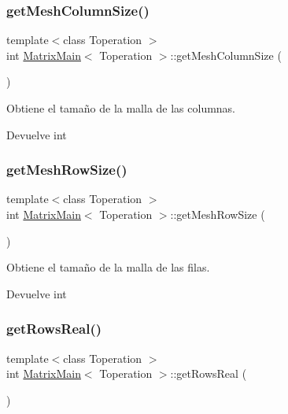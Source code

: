 \subsubsection{\texorpdfstring{get\+Mesh\+Column\+Size()}{getMeshColumnSize()}}
{\footnotesize\ttfamily template$<$class Toperation $>$ \\
int \hyperlink{classMatrixMain}{Matrix\+Main}$<$ Toperation $>$\+::get\+Mesh\+Column\+Size (\begin{DoxyParamCaption}{ }\end{DoxyParamCaption})}



Obtiene el tamaño de la malla de las columnas. 

\begin{DoxyReturn}{Devuelve}
int 
\end{DoxyReturn}
\mbox{\label{classMatrixMain_ab7d8f63bf41a6ba3d77dfddda7d891db}} 
\subsubsection{\texorpdfstring{get\+Mesh\+Row\+Size()}{getMeshRowSize()}}
{\footnotesize\ttfamily template$<$class Toperation $>$ \\
int \hyperlink{classMatrixMain}{Matrix\+Main}$<$ Toperation $>$\+::get\+Mesh\+Row\+Size (\begin{DoxyParamCaption}{ }\end{DoxyParamCaption})}



Obtiene el tamaño de la malla de las filas. 

\begin{DoxyReturn}{Devuelve}
int 
\end{DoxyReturn}
\mbox{\label{classMatrixMain_a0d936d844e9b03ff05979220be754461}} 
\subsubsection{\texorpdfstring{get\+Rows\+Real()}{getRowsReal()}}
{\footnotesize\ttfamily template$<$class Toperation $>$ \\
int \hyperlink{classMatrixMain}{Matrix\+Main}$<$ Toperation $>$\+::get\+Rows\+Real (\begin{DoxyParamCaption}{ }\end{DoxyParamCaption})}



